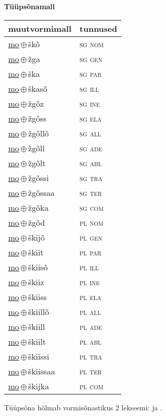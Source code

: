 

\vspace{3.5em}
\noindent \begin{minipage}{\textwidth}
\noindent \textbf{Tüüpsõnamall \,}\\

\begin{sideways}
\begin{tabular}{l l}
muutvormimall & tunnused \\
\hline
\underline{mo}\,$\oplus$\,škõ & \textsc{ sg nom } \\
\underline{mo}\,$\oplus$\,žga & \textsc{ sg gen } \\
\underline{mo}\,$\oplus$\,ška & \textsc{ sg par } \\
\underline{mo}\,$\oplus$\,škasõ & \textsc{ sg ill } \\
\underline{mo}\,$\oplus$\,žgõz & \textsc{ sg ine } \\
\underline{mo}\,$\oplus$\,žgõss & \textsc{ sg ela } \\
\underline{mo}\,$\oplus$\,žgõllõ & \textsc{ sg all } \\
\underline{mo}\,$\oplus$\,žgõll & \textsc{ sg ade } \\
\underline{mo}\,$\oplus$\,žgõlt & \textsc{ sg abl } \\
\underline{mo}\,$\oplus$\,žgõssi & \textsc{ sg tra } \\
\underline{mo}\,$\oplus$\,žgõssaa & \textsc{ sg ter } \\
\underline{mo}\,$\oplus$\,žgõka & \textsc{ sg com } \\
\underline{mo}\,$\oplus$\,žgõd & \textsc{ pl nom } \\
\underline{mo}\,$\oplus$\,škijõ & \textsc{ pl gen } \\
\underline{mo}\,$\oplus$\,škiit & \textsc{ pl par } \\
\underline{mo}\,$\oplus$\,škiisõ & \textsc{ pl ill } \\
\underline{mo}\,$\oplus$\,škiiz & \textsc{ pl ine } \\
\underline{mo}\,$\oplus$\,škiiss & \textsc{ pl ela } \\
\underline{mo}\,$\oplus$\,škiillõ & \textsc{ pl all } \\
\underline{mo}\,$\oplus$\,škiill & \textsc{ pl ade } \\
\underline{mo}\,$\oplus$\,škiilt & \textsc{ pl abl } \\
\underline{mo}\,$\oplus$\,škiissi & \textsc{ pl tra } \\
\underline{mo}\,$\oplus$\,škiissaa & \textsc{ pl ter } \\
\underline{mo}\,$\oplus$\,škijka & \textsc{ pl com } \\
\end{tabular}
\end{sideways}
\label{tab:tüüpsõnamall-moškõ}

\end{minipage}

 
\vspace{1em}
\noindent Tüüpsõna hõlmab vormisõnastikus 2 lekseemi:  ja .
